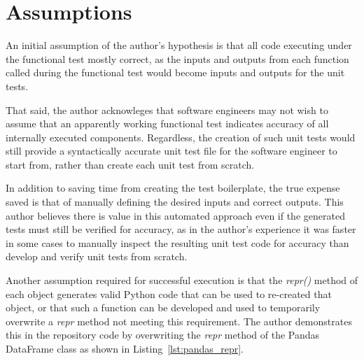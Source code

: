 \section{Assumptions}\label{sec:assumptions}

An initial assumption of the author's hypothesis is that all code executing under the
functional test mostly correct, as the inputs and outputs from each
function called during the functional test would become inputs and outputs for the
unit tests.  

That said, the author acknowleges that software engineers may not 
wish to assume that an apparently working functional test indicates accuracy of 
all internally executed components. Regardless, the creation of such unit 
tests would still provide a syntactically accurate unit
test file for the software engineer to start from, rather than create each unit
test from scratch.  

In addition to saving time from creating the test
boilerplate, the true expense saved is that of manually defining the desired
inputs and correct outputs.  This author believes there is value in this automated
approach even if the generated tests must still be verified for accuracy,
as in the author's experience it was faster in some cases to manually inspect 
the resulting unit test code for accuracy than develop and verify unit tests from scratch.

Another assumption required for successful execution is that the \textit{repr()} method
of each object generates valid Python code that can be used to re-created that
object, or that such a function can be developed and used to temporarily
overwrite a \textit{repr\(\)} method not meeting this requirement.  The author demonstrates
this in the repository code by overwriting the \textit{repr\(\)} method of the
Pandas DataFrame class as shown in Listing~\ref{lst:pandas_repr}.

 
 
